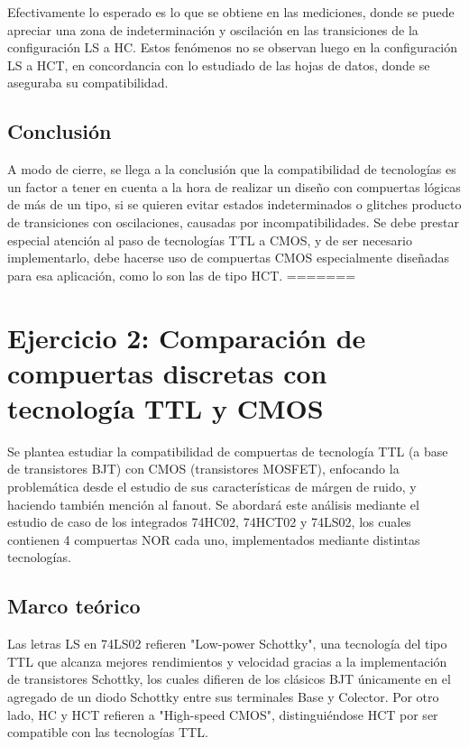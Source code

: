 Efectivamente lo esperado es lo que se obtiene en las mediciones, donde se puede apreciar una zona de indeterminación y oscilación en las transiciones de la configuración 
LS a HC.
Estos fenómenos no se observan luego en la configuración LS a HCT, en concordancia con lo estudiado de las hojas de datos, donde se aseguraba su compatibilidad.



\subsection{Conclusi\'on}
A modo de cierre, se llega a la conclusión que la compatibilidad de tecnologías es un factor a tener en cuenta a la hora de realizar un diseño con compuertas lógicas de 
más de un tipo, si se quieren evitar estados indeterminados o glitches producto de transiciones con oscilaciones, causadas por incompatibilidades.
Se debe prestar especial atención al paso de tecnologías TTL a CMOS, y de ser necesario implementarlo, debe hacerse uso de compuertas CMOS especialmente diseñadas para 
esa aplicación, como lo son las de tipo HCT.
=======
\section{Ejercicio 2: Comparaci\'on de compuertas discretas con tecnolog\'ia TTL y CMOS}
Se plantea estudiar la compatibilidad de compuertas de tecnología TTL (a base de transistores BJT) con CMOS (transistores MOSFET), enfocando la problemática desde el 
estudio de sus características de márgen de ruido, y haciendo también mención al fanout. 
Se abordará este análisis mediante el estudio de caso de los integrados 74HC02, 74HCT02 y 74LS02, los cuales contienen 4 compuertas NOR cada uno, implementados mediante 
distintas tecnologías.



\subsection{Marco teórico}
Las letras LS en 74LS02 refieren "Low-power Schottky", una tecnología del tipo TTL que alcanza mejores rendimientos y velocidad gracias a la implementación de 
transistores Schottky, los cuales difieren de los clásicos BJT únicamente en el agregado de un diodo Schottky entre sus terminales Base y Colector.
Por otro lado, HC y HCT refieren a "High-speed CMOS", distinguiéndose HCT por ser compatible con las tecnologías TTL.

